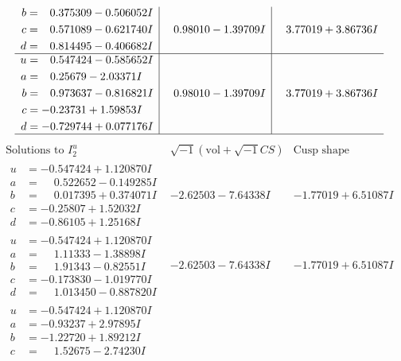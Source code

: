 \documentclass[1p]{elsarticle_modified}
\theoremstyle{definition}
\newcommand{\I}{\sqrt{-1}}
\begin{document}
$$\begin{array}{c|c|c}
\begin{aligned}
b &= \phantom{-}0.375309 - 0.506052 I \\
c &= \phantom{-}0.571089 - 0.621740 I \\
d &= \phantom{-}0.814495 - 0.406682 I\end{aligned}
 & \phantom{-}0.98010 - 1.39709 I & \phantom{-}3.77019 + 3.86736 I \\ \hline\begin{aligned}
u &= \phantom{-}0.547424 - 0.585652 I \\
a &= \phantom{-}0.25679 - 2.03371 I \\
b &= \phantom{-}0.973637 - 0.816821 I \\
c &= -0.23731 + 1.59853 I \\
d &= -0.729744 + 0.077176 I\end{aligned}
 & \phantom{-}0.98010 - 1.39709 I & \phantom{-}3.77019 + 3.86736 I\\
 \hline 
 \end{array}$$\newpage$$\begin{array}{c|c|c}  
\text{Solutions to }I^u_{2}& \I (\text{vol} + \sqrt{-1}CS) & \text{Cusp shape}\\
 \hline 
\begin{aligned}
u &= -0.547424 + 1.120870 I \\
a &= \phantom{-}0.522652 - 0.149285 I \\
b &= \phantom{-}0.017395 + 0.374071 I \\
c &= -0.25807 + 1.52032 I \\
d &= -0.86105 + 1.25168 I\end{aligned}
 & -2.62503 - 7.64338 I & -1.77019 + 6.51087 I \\ \hline\begin{aligned}
u &= -0.547424 + 1.120870 I \\
a &= \phantom{-}1.11333 - 1.38898 I \\
b &= \phantom{-}1.91343 - 0.82551 I \\
c &= -0.173830 - 1.019770 I \\
d &= \phantom{-}1.013450 - 0.887820 I\end{aligned}
 & -2.62503 - 7.64338 I & -1.77019 + 6.51087 I \\ \hline\begin{aligned}
u &= -0.547424 + 1.120870 I \\
a &= -0.93237 + 2.97895 I \\
b &= -1.22720 + 1.89212 I \\
c &= \phantom{-}1.52675 - 2.74230 I \\

\end{aligned}
\end{array}$$
\end{document}
